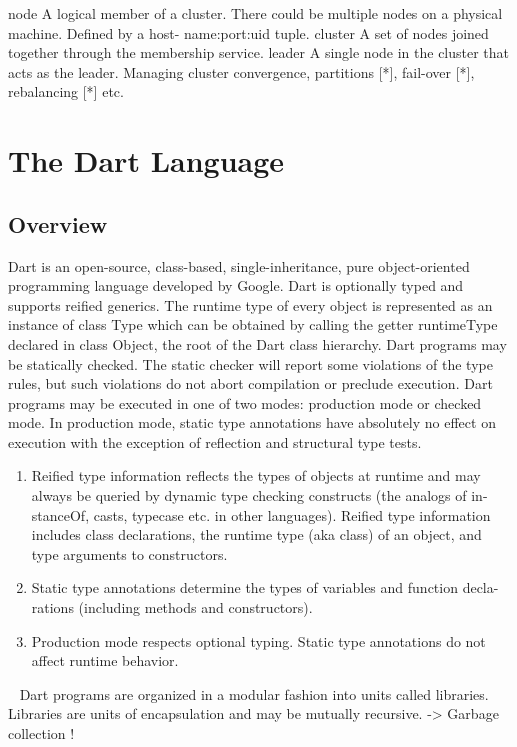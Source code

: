   node A logical member of a cluster. There could be multiple nodes on a physical machine. Defined by a host- name:port:uid tuple.
  cluster A set of nodes joined together through the membership service.
  leader A single node in the cluster that acts as the leader. Managing cluster convergence, partitions [*], fail-over [*], rebalancing [*] etc.


\section{The Dart Language}
  \subsection{Overview}
  Dart is an open-source, class-based, single-inheritance, pure object-oriented programming language developed by Google. Dart is optionally typed and supports reified generics. The runtime type of every object is represented as an instance of class Type which can be obtained by calling the getter runtimeType declared in class Object, the root of the Dart class hierarchy.
  Dart programs may be statically checked. The static checker will report some violations of the type rules, but such violations do not abort compilation or preclude execution.
  Dart programs may be executed in one of two modes: production mode or checked mode. In production mode, static type annotations have absolutely no effect on execution with the exception of reflection and structural type tests.
  \begin{enumerate}
  \item Reified type information reflects the types of objects at runtime and may always be queried by dynamic type checking constructs (the analogs of in- stanceOf, casts, typecase etc. in other languages). Reified type information includes class declarations, the runtime type (aka class) of an object, and type arguments to constructors.
  \item Static type annotations determine the types of variables and function decla- rations (including methods and constructors).
  \item Production mode respects optional typing. Static type annotations do not affect runtime behavior.
  \end{enumerate}
~\parencite{dartEcma}
Dart programs are organized in a modular fashion into units called libraries. Libraries are units of encapsulation and may be mutually recursive.
\newline
-> Garbage collection !

